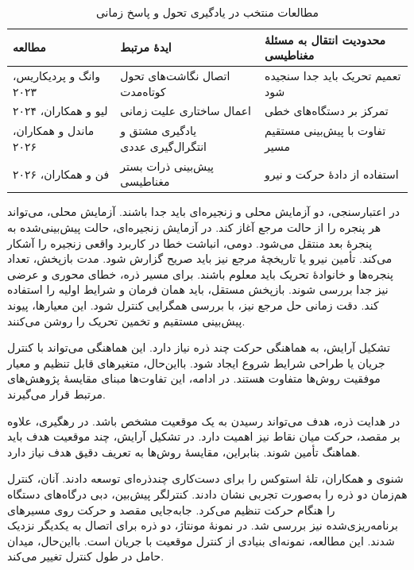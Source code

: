 \begin{table}[htbp]
\centering
\caption{مطالعات منتخب در یادگیری تحول و پاسخ زمانی}
\label{tab:lit-temporal-operator-studies}
\begin{tabular}{p{}p{}p{}}
\hline
مطالعه & ایدهٔ مرتبط & محدودیت انتقال به مسئلهٔ مغناطیسی \\
\hline
وانگ و پردیکاریس، ۲۰۲۳ & اتصال نگاشت‌های تحول کوتاه‌مدت & تعمیم تحریک باید جدا سنجیده شود \\
لیو و همکاران، ۲۰۲۴ & اعمال ساختاری علیت زمانی & تمرکز بر دستگاه‌های خطی \\
ماندل و همکاران، ۲۰۲۶ & یادگیری مشتق و انتگرال‌گیری عددی & تفاوت با پیش‌بینی مستقیم مسیر \\
فن و همکاران، ۲۰۲۶ & پیش‌بینی ذرات بستر مغناطیسی & استفاده از دادهٔ حرکت و نیرو \\
\hline
\end{tabular}
\end{table}

در اعتبارسنجی، دو آزمایش محلی و زنجیره‌ای باید جدا باشند.
آزمایش محلی، می‌تواند هر پنجره را از حالت مرجع آغاز کند.
در آزمایش زنجیره‌ای، حالت پیش‌بینی‌شده به پنجرهٔ بعد منتقل می‌شود.
دومی، انباشت خطا در کاربرد واقعی زنجیره را آشکار می‌کند.
تأمین نیرو یا تاریخچهٔ مرجع نیز باید صریح گزارش شود.
مدت بازپخش، تعداد پنجره‌ها و خانوادهٔ تحریک باید معلوم باشند.
برای مسیر ذره، خطای محوری و عرضی نیز جدا بررسی شوند.
بازپخش مستقل، باید همان فرمان و شرایط اولیه را استفاده کند.
دقت زمانی حل مرجع نیز، با بررسی همگرایی کنترل شود.
این معیارها، پیوند پیش‌بینی مستقیم و تخمین تحریک را روشن می‌کنند.

\label{sec:lit-release-formation}

تشکیل آرایش، به هماهنگی حرکت چند ذره نیاز دارد.
این هماهنگی می‌تواند با کنترل جریان یا طراحی شرایط شروع ایجاد شود.
بااین‌حال، متغیرهای قابل تنظیم و معیار موفقیت روش‌ها متفاوت هستند.
در ادامه، این تفاوت‌ها مبنای مقایسهٔ پژوهش‌های مرتبط قرار می‌گیرند.

\label{sec:lit-particle-terminal-control}

در هدایت ذره، هدف می‌تواند رسیدن به یک موقعیت مشخص باشد.
در رهگیری، علاوه بر مقصد، حرکت میان نقاط نیز اهمیت دارد.
در تشکیل آرایش، چند موقعیت هدف باید هماهنگ تأمین شوند.
بنابراین، مقایسهٔ روش‌ها به تعریف دقیق هدف نیاز دارد.

شنوی و همکاران، تلهٔ استوکس را برای دست‌کاری چندذره‌ای توسعه دادند.
آنان، کنترل هم‌زمان دو ذره را به‌صورت تجربی نشان دادند.
کنترلگر پیش‌بین، دبی درگاه‌های دستگاه را هنگام حرکت تنظیم می‌کرد.
جابه‌جایی مقصد و حرکت روی مسیرهای برنامه‌ریزی‌شده نیز بررسی شد.
در نمونهٔ مونتاژ، دو ذره برای اتصال به یکدیگر نزدیک شدند.
این مطالعه، نمونه‌ای بنیادی از کنترل موقعیت با جریان است.
بااین‌حال، میدان حامل در طول کنترل تغییر می‌کند.
\cite{Shenoy2016StokesTrap}

